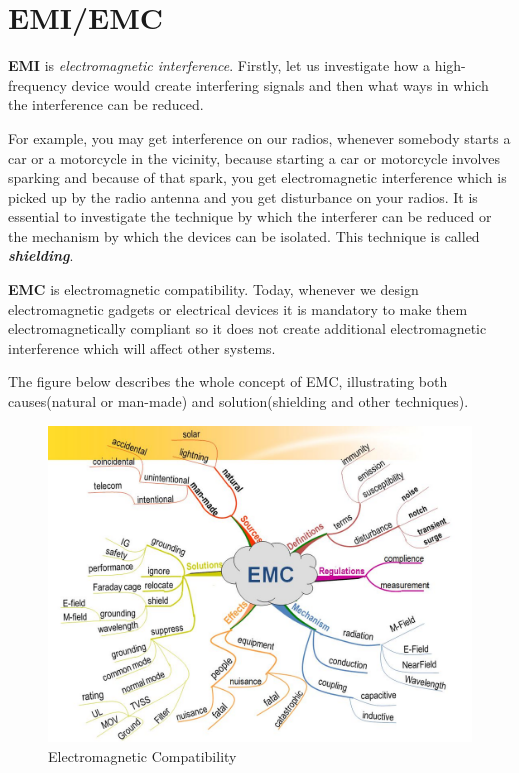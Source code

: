 \section{EMI/EMC}

\textbf{EMI} is \textit{electromagnetic interference}. Firstly, let us investigate how a high-frequency device would create interfering signals and then what ways in which the interference can be reduced.

For example, you may get interference on our radios, whenever somebody starts a car or a motorcycle in the vicinity, because starting a car or motorcycle involves sparking and because of that spark, you get electromagnetic interference which is picked up by the radio antenna and you get disturbance on your radios. It is essential to investigate the technique by which the interferer can be reduced or the mechanism by which the devices can be isolated. This technique is called \textit{\textbf{shielding}}.

\textbf{EMC} is electromagnetic compatibility. Today, whenever we design electromagnetic gadgets or electrical devices it is mandatory to make them electromagnetically compliant so it does not create additional electromagnetic interference which will affect other systems.

The figure below describes the whole concept of EMC, illustrating both causes(natural or man-made) and solution(shielding and other techniques).

\begin{figure}[h]
\centering
\includegraphics[scale=0.35]{./graphics/634771461726914062}
\caption{Electromagnetic Compatibility}
\label{fig:634771461726914062}
\end{figure}


